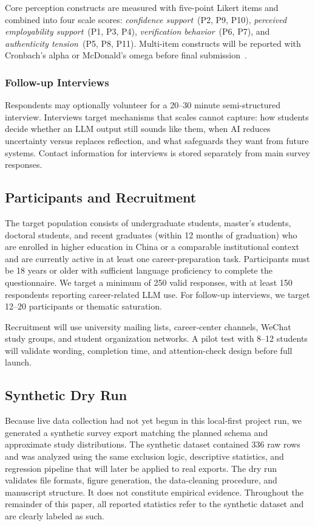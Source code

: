 \documentclass[sigconf,review,anonymous]{acmart}
\begin{document}
Core perception constructs are measured with five-point Likert items and
combined into four scale scores: \textit{confidence support}~(P2, P9, P10),
\textit{perceived employability support}~(P1, P3, P4), \textit{verification
behavior}~(P6, P7), and \textit{authenticity tension}~(P5, P8, P11).
Multi-item constructs will be reported with Cronbach's alpha or McDonald's
omega before final submission~\cite{bennett2022employability,
jin2009careerdecision}.

\subsubsection{Follow-up Interviews}
Respondents may optionally volunteer for a 20--30 minute semi-structured
interview.  Interviews target mechanisms that scales cannot capture: how
students decide whether an LLM output still sounds like them, when AI
reduces uncertainty versus replaces reflection, and what safeguards they
want from future systems.  Contact information for interviews is stored
separately from main survey responses.

\subsection{Participants and Recruitment}

The target population consists of undergraduate students, master's students,
doctoral students, and recent graduates (within 12 months of graduation) who
are enrolled in higher education in China or a comparable institutional
context and are currently active in at least one career-preparation task.
Participants must be 18 years or older with sufficient language proficiency
to complete the questionnaire.  We target a minimum of 250 valid responses,
with at least 150 respondents reporting career-related LLM use.  For
follow-up interviews, we target 12--20 participants or thematic saturation.

Recruitment will use university mailing lists, career-center channels,
WeChat study groups, and student organization networks.  A pilot test with
8--12 students will validate wording, completion time, and attention-check
design before full launch.

\subsection{Synthetic Dry Run}

Because live data collection had not yet begun in this local-first project
run, we generated a synthetic survey export matching the planned schema and
approximate study distributions.  The synthetic dataset contained 336 raw
rows and was analyzed using the same exclusion logic, descriptive statistics,
and regression pipeline that will later be applied to real exports.  The dry
run validates file formats, figure generation, the data-cleaning procedure,
and manuscript structure.  It does not constitute empirical evidence.
Throughout the remainder of this paper, all reported statistics refer to the
synthetic dataset and are clearly labeled as such.
\end{document}
